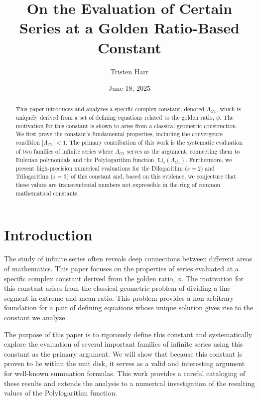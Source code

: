 \documentclass{amsart}
\theoremstyle{plain}
\theoremstyle{definition}
\theoremstyle{remark}
\newcommand{\LambdaG}{\Lambda_{G1}}
\begin{document}
\title[Series Evaluations at a Golden Ratio Constant]{On the Evaluation of Certain Series at a Golden Ratio-Based Constant}
\author{Tristen Harr}
\date{June 18, 2025}

\begin{abstract}
This paper introduces and analyzes a specific complex constant, denoted $\Lambda_{G1}$, which is uniquely derived from a set of defining equations related to the golden ratio, $\phi$. The motivation for this constant is shown to arise from a classical geometric construction. We first prove the constant's fundamental properties, including the convergence condition $|\LambdaG| < 1$. The primary contribution of this work is the systematic evaluation of two families of infinite series where $\LambdaG$ serves as the argument, connecting them to Eulerian polynomials and the Polylogarithm function, $\mathrm{Li}_s(\LambdaG)$. Furthermore, we present high-precision numerical evaluations for the Dilogarithm ($s=2$) and Trilogarithm ($s=3$) of this constant and, based on this evidence, we conjecture that these values are transcendental numbers not expressible in the ring of common mathematical constants.
\end{abstract}

\maketitle

\section{Introduction}
The study of infinite series often reveals deep connections between different areas of mathematics. This paper focuses on the properties of series evaluated at a specific complex constant derived from the golden ratio, $\phi$. The motivation for this constant arises from the classical geometric problem of dividing a line segment in extreme and mean ratio. This problem provides a non-arbitrary foundation for a pair of defining equations whose unique solution gives rise to the constant we analyze.

The purpose of this paper is to rigorously define this constant and systematically explore the evaluation of several important families of infinite series using this constant as the primary argument. We will show that because this constant is proven to lie within the unit disk, it serves as a valid and interesting argument for well-known summation formulas. This work provides a careful cataloging of these results and extends the analysis to a numerical investigation of the resulting values of the Polylogarithm function.
\end{document}
